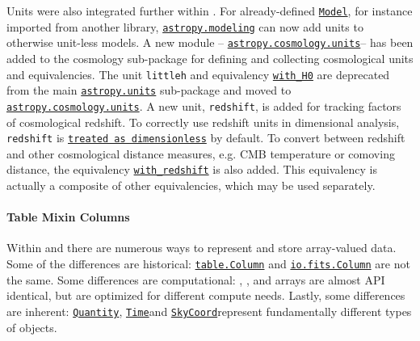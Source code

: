 \documentclass[modern]{aastex631}
\newcommand{\astropysubpkg}[1]{\href{http://docs.astropy.org/en/stable/#1/index.html}{\texttt{astropy.#1}}\xspace}
\newcommand{\astropycosmologyunits}{\href{https://docs.astropy.org/en/stable/cosmology/units.html}{\texttt{astropy.cosmology.units}}}
\newcommand{\astropyunits}{\astropysubpkg{units}}
\newcommand{\astropymodeling}{\astropysubpkg{modeling}}
\newcommand{\astropyapi}[2]{\href{https://docs.astropy.org/en/stable/api/astropy.#1.html}{#2}}
\newcommand{\astropyapidoc}[2]{\astropyapi{#1}{\texttt{#2}\xspace}}
\newcommand{\astropySkyCoord}{\astropyapidoc{coordinates.SkyCoord}{SkyCoord}}
\newcommand{\astropyModel}{\astropyapidoc{modeling.Model}{Model}}
\newcommand{\astropyTime}{\astropyapidoc{time.Time}{Time}}
\newcommand{\astropyQuantity}{\astropyapidoc{units.Quantity}{Quantity}}
\begin{document}
    Units were also integrated further within \astropypkg. For already-defined
    \astropyModel, for instance imported from another library, \astropymodeling
    can now add units to otherwise unit-less models.
    A new module – \astropycosmologyunits – has been added to the cosmology
    sub-package for defining and collecting cosmological units and
    equivalencies. The unit \texttt{littleh} and equivalency
    \astropyapidoc{cosmology.units.with_H0}{with\_H0} are deprecated from the
    main \astropyunits sub-package and moved to \astropycosmologyunits. A new
    unit, \texttt{redshift}, is added for tracking factors of cosmological
    redshift. To correctly use redshift units in dimensional analysis,
    \texttt{redshift} is
    \astropyapidoc{cosmology.units.dimensionless_redshift}{treated as
    dimensionless} by default. To convert between redshift and other
    cosmological distance measures, e.g. CMB temperature or comoving distance,
    the equivalency
    \astropyapidoc{cosmology.units.with_redshift}{with\_redshift}
    is also added. This equivalency is actually a composite of other
    equivalencies, which may be used separately.

  \paragraph{Table Mixin Columns}


    Within \astropypkg and \python there are numerous ways to represent and
    store array-valued data. Some of the differences are historical:
    \astropyapidoc{table.Column}{table.Column} and
    \astropyapidoc{io.fits.Column}{io.fits.Column} are not the same. Some
    differences are computational: , , and
     arrays are almost API identical, but are optimized for
    different compute needs. Lastly, some differences are inherent:
    \astropyQuantity, \astropyTime and \astropySkyCoord represent fundamentally
    different types of objects.
\end{document}
